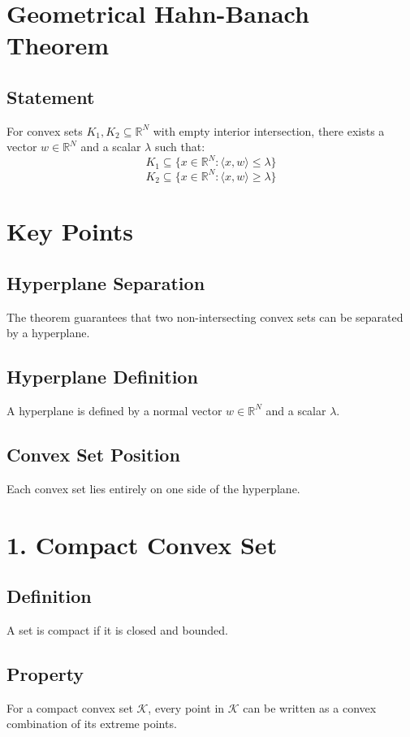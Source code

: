\documentclass{article}
\begin{document}
\section*{Geometrical Hahn-Banach Theorem}

\subsection*{Statement}
For convex sets \( K_1, K_2 \subseteq \mathbb{R}^N \) with empty interior intersection, there exists a vector \( w \in \mathbb{R}^N \) and a scalar \( \lambda \) such that:
\[
K_1 \subseteq \{ x \in \mathbb{R}^N : \langle x, w \rangle \leq \lambda \}
\]
\[
K_2 \subseteq \{ x \in \mathbb{R}^N : \langle x, w \rangle \geq \lambda \}
\]

\section*{Key Points}

\subsection*{Hyperplane Separation}
The theorem guarantees that two non-intersecting convex sets can be separated by a hyperplane.

\subsection*{Hyperplane Definition}
A hyperplane is defined by a normal vector \( w \in \mathbb{R}^N \) and a scalar \( \lambda \).

\subsection*{Convex Set Position}
Each convex set lies entirely on one side of the hyperplane.

\section*{1. Compact Convex Set}

\subsection*{Definition}
A set is compact if it is closed and bounded.

\subsection*{Property}
For a compact convex set \( \mathcal{K} \), every point in \( \mathcal{K} \) can be written as a convex combination of its extreme points.
\end{document}
